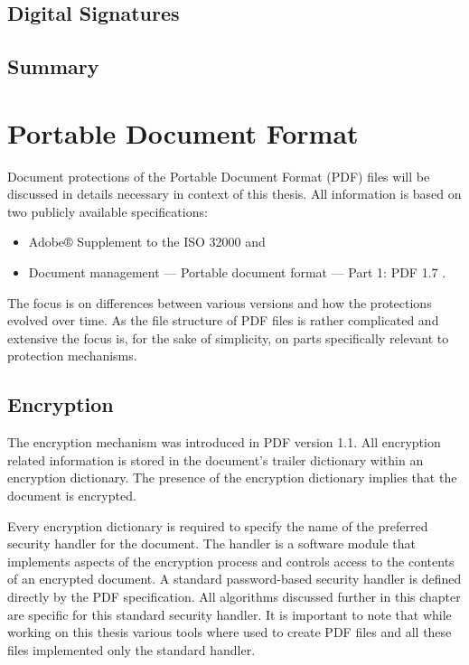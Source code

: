 \documentclass[11pt,oneside]{fithesis2}
\begin{document}
\section{Digital Signatures}\label{data_integrity}

\section{Summary}

\chapter{Portable Document Format}

Document protections of the Portable Document Format (PDF) files will be discussed in details necessary in context of this thesis. All information is based on two publicly available specifications:

\begin{itemize}
\setlength\itemsep{0.1em}
\item{Adobe® Supplement to the ISO 32000 \cite{iso32000sup} and}
\item{Document management — Portable document format — Part 1: PDF 1.7 \cite{pdf_spec}.}
\end{itemize}

The focus is on differences between various versions and how the protections evolved over time. As the file structure of PDF files is rather complicated and extensive the focus is, for the sake of simplicity, on parts specifically relevant to protection mechanisms.

\section{Encryption}

The encryption mechanism was introduced in PDF version 1.1. All encryption related information is stored in the document's trailer dictionary \cite[p. 42]{pdf_spec} within an encryption dictionary. The presence of the encryption dictionary implies that the document is encrypted.

Every encryption dictionary is required to specify the name of the preferred security handler for the document. The handler is a software module that implements aspects of the encryption process and controls access to the contents of an encrypted document. A standard password-based security handler is defined directly by the PDF specification. All algorithms discussed further in this chapter are specific for this standard security handler. It is important to note that while working on this thesis various tools where used to create PDF files and all these files implemented only the standard handler.
\end{document}
